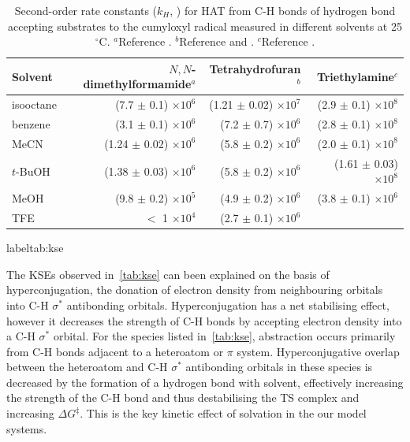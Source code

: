 \begin{table}[htb]
{\footnotesize
\centering
  \begin{tabular}{l r r r}
    Solvent & $N,N$-dimethylformamide$^a$ & Tetrahydrofuran$^b$ & Triethylamine$^c$ \\
\toprule
\toprule
    isooctane & (7.7 $\pm$ 0.1) $\times 10^6$ & (1.21 $\pm$ 0.02) $\times 10^7$ & \rule{0pt}{3ex} (2.9 $\pm$ 0.1) $\times 10^8$  \\
    benzene & (3.1 $\pm$ 0.1) $\times 10^6$ & (7.2 $\pm$ 0.7) $\times 10^6$ & (2.8 $\pm$ 0.1) $\times 10^8$ \\
    MeCN & (1.24 $\pm$ 0.02) $\times 10^6$ & (5.8 $\pm$ 0.2) $\times 10^6$ & (2.0 $\pm$ 0.1) $\times 10^8$ \\
    $t$-BuOH & (1.38 $\pm$ 0.03) $\times 10^6$ & (5.8 $\pm$ 0.2) $\times 10^6$ & (1.61 $\pm$ 0.03) $\times 10^8$ \\
    MeOH & (9.8 $\pm$ 0.2) $\times 10^5$ & (4.9 $\pm$ 0.2) $\times 10^6$ & (3.8 $\pm$ 0.1) $\times 10^6$ \\
    TFE & $<$ 1 $\times 10^4$ & (2.7 $\pm$ 0.1) $\times 10^6$ & \\
  \end{tabular}
  \caption[Summary of second-order rate constants for HAT from C-H bonds for
  hydrogen bond accepting substrates from the cumyloxyl radical.]{Second-order
    rate constants ($k_H$, \Ms) for HAT from C-H bonds of hydrogen bond
    accepting substrates to the cumyloxyl radical measured in different
    solvents at 25 $^{\circ}$C. $^a$Reference
    . $^b$Reference  and
    . $^c$Reference .}
label{tab:kse}
}
\end{table}


The KSEs observed in~\ref{tab:kse} can been explained on the basis of
hyperconjugation, the donation of electron density from neighbouring orbitals
into C-H $\sigma^*$ antibonding orbitals. Hyperconjugation has a net stabilising
effect, however it decreases the strength of C-H bonds by accepting electron
density into a C-H $\sigma^*$ orbital. For the species listed in~\ref{tab:kse},
abstraction occurs primarily from C-H bonds adjacent to a heteroatom or $\pi$
system. Hyperconjugative overlap between the heteroatom and C-H $\sigma^*$
antibonding orbitals in these species is decreased by the formation of a
hydrogen bond with solvent, effectively increasing the strength of the C-H bond
and thus destabilising the TS complex and increasing $\Delta G^{\ddagger}$. This
is the key kinetic effect of solvation in the our model systems.



